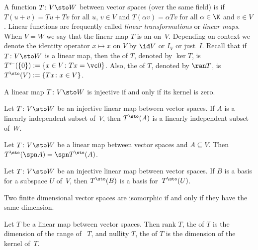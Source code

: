 \begin{defn}\label{defn_op_vsp} A function $T\colon V \sto W$ between vector spaces (over the same field) is
 if $T(u + v) = Tu + Tv$ for all $u$, $v \in V$ and $T(\alpha v) = \alpha Tv$
for all $\alpha \in \K$ and $v \in V$. Linear functions are frequently called
\emph{linear transformations} or \emph{linear maps}. When $V = W$ we say that the linear map $T$ is an
 on~$V$. Depending on context we denote the identity operator $x \mapsto x$ on $V$
by $\id V$ or $I_V$ or just~$I$. Recall that if $T\colon V \sto W$ is a linear map, then the
 of $T$, denoted by $\ker T$, is $T^{\gets}(\{0\}) := \{x \in V\colon Tx = \vc
0\}$. Also, the
 of $T$, denoted by $\ran T$, is $T^{\sto}(V) := \{Tx\colon x \in V\}$.
\end{defn}

\begin{prop} A linear map $T\colon V \sto W$ is injective if and only if its kernel is zero.
\end{prop}

\begin{prop} Let $T\colon V \sto W$ be an injective linear map between vector spaces. If $A$ is a linearly independent
subset of~$V$, then $T^\sto(A)$ is a linearly independent subset of~$W$.
\end{prop}

\begin{prop} Let $T\colon V \sto W$ be a linear map between vector spaces and $A \subseteq V$.
Then $T^\sto(\spn A) = \spn T^\sto(A)$.
\end{prop}

\begin{prop} Let $T\colon V \sto W$ be an injective linear map between vector spaces. If $B$ is a basis
for a subspace $U$ of~$V$, then $T^\sto(B)$ is a basis for~$T^\sto(U)$.
\end{prop}

\begin{prop} Two finite dimensional vector spaces are isomorphic if and only if they have the same dimension.
\end{prop}

\begin{defn} Let $T$ be a linear map between vector spaces. Then $\textrm{rank }T$, the
 of $T$ is the dimension of the range of ~$T$, and $\textrm{nullity }T$, the
 of $T$ is the dimension of the kernel of~$T$.
\end{defn}

